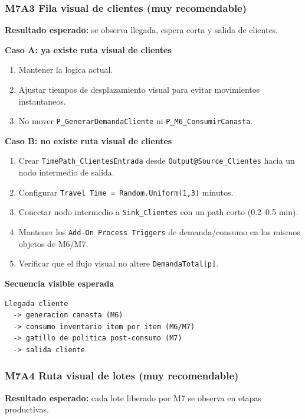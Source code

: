 \documentclass[11pt]{article}
\newcommand{\simio}[1]{\texttt{#1}}
\newcommand{\state}[1]{\texttt{#1}}
\newcommand{\proc}[1]{\texttt{#1}}
\begin{document}
\subsubsection{M7A3 Fila visual de clientes (muy recomendable)}
\textbf{Resultado esperado:} se observa llegada, espera corta y salida de clientes.

\textbf{Caso A: ya existe ruta visual de clientes}
\begin{enumerate}
  \item Mantener la logica actual.
  \item Ajustar tiempos de desplazamiento visual para evitar movimientos instantaneos.
  \item No mover \proc{P\_GenerarDemandaCliente} ni \proc{P\_M6\_ConsumirCanasta}.
\end{enumerate}

\textbf{Caso B: no existe ruta visual de clientes}
\begin{enumerate}
  \item Crear \simio{TimePath\_ClientesEntrada} desde \simio{Output@Source\_Clientes} hacia un nodo intermedio de salida.
  \item Configurar \simio{Travel Time = Random.Uniform(1,3)} minutos.
  \item Conectar nodo intermedio a \simio{Sink\_Clientes} con un path corto (0.2--0.5 min).
  \item Mantener los \simio{Add-On Process Triggers} de demanda/consumo en los mismos objetos de M6/M7.
  \item Verificar que el flujo visual no altere \state{DemandaTotal[p]}.
\end{enumerate}

\textbf{Secuencia visible esperada}
\begin{lstlisting}[caption={Secuencia visual esperada de clientes en M7A}]
Llegada cliente
  -> generacion canasta (M6)
  -> consumo inventario item por item (M6/M7)
  -> gatillo de politica post-consumo (M7)
  -> salida cliente
\end{lstlisting}

\subsubsection{M7A4 Ruta visual de lotes (muy recomendable)}
\textbf{Resultado esperado:} cada lote liberado por M7 se observa en etapas productivas.
\end{document}
